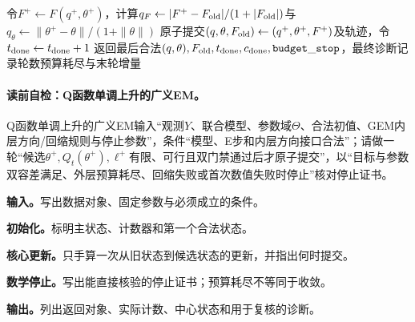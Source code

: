 \begin{AlgorithmContract}
\begin{algorithm}[H]
{  令$F^+\leftarrow F(q^+,\theta^+)$，计算$q_F\leftarrow|F^+-F_{\rm old}|/(1+|F_{\rm old}|)$与$q_\theta\leftarrow\|\theta^+-\theta\|/(1+\|\theta\|)$\;
  原子提交$(q,\theta,F_{\rm old})\leftarrow(q^+,\theta^+,F^+)$及轨迹，令$t_{\rm done}\leftarrow t_{\rm done}+1$\;
}
返回最后合法$(q,\theta),F_{\rm old},t_{\rm done},c_{\rm done},\mathtt{budget\_stop}$，最终诊断记录轮数预算耗尽与末轮增量\;
\end{algorithm}
\end{AlgorithmContract}

\paragraph{读前自检：Q函数单调上升的广义EM。}Q函数单调上升的广义EM输入“观测$Y$、联合模型、参数域$\Theta$、合法初值、GEM内层方向/回缩规则与停止参数”，条件“模型、E步和内层方向接口合法”；请做一轮“候选$\theta^+,Q_t(\theta^+),\ell^+$有限、可行且双门禁通过后才原子提交”，以“目标与参数双容差满足、外层预算耗尽、回缩失败或首次数值失败时停止”核对停止证书。\par


\begin{keypointbox}[title={以 Q 上升为门禁的GEM：五步阅读}]
\textbf{输入。}写出数据对象、固定参数与必须成立的条件。\par
\textbf{初始化。}标明主状态、计数器和第一个合法状态。\par
\textbf{核心更新。}只手算一次从旧状态到候选状态的更新，并指出何时提交。\par
\textbf{数学停止。}写出能直接核验的停止证书；预算耗尽不等同于收敛。\par
\textbf{输出。}列出返回对象、实际计数、中心状态和用于复核的诊断。
\end{keypointbox}

